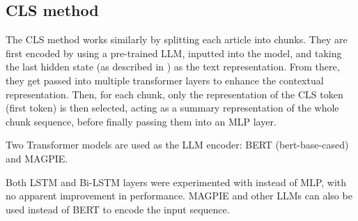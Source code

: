 \subsection{CLS method}

The CLS method works similarly by splitting each article into chunks. They are first encoded by using a pre-trained LLM, inputted into the model, and taking the last hidden state (as described in \cite{sun-2020-fine-tune}) as the text representation. From there, they get passed into multiple transformer layers to enhance the contextual representation. Then, for each chunk, only the representation of the CLS token (first token) is then selected, acting as a summary representation of the whole chunk sequence, before finally passing them into an MLP layer.

Two Transformer models are used as the LLM encoder: BERT (bert-base-cased) and MAGPIE.

Both LSTM and Bi-LSTM layers were experimented with instead of MLP, with no apparent improvement in performance. MAGPIE and other LLMs can also be used instead of BERT to encode the input sequence.

